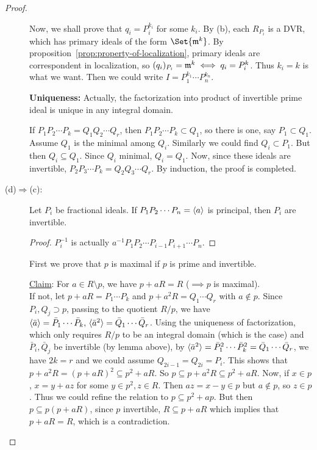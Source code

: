 \begin{theorem}
\begin{proof}
\begin{description}
        Now, we shall prove that $q_i = P_i^{k_i}$ for some $k_i$.
        By (b), each $R_{P_i}$ is a DVR, which has primary ideals
        of the form $\Set{\mf^k}$. By proposition~\ref{prop:property-of-localization},
        primary ideals are correspondent in localization,
        so $(q_i)_{P_i} = \mathfrak{m}^k \iff q_i = P_i^k$. Thus $k_i = k$
        is what we want. Then we could write $I = P_1^{k_1} \dotsm P_n^{k_n}$.

        {\bf Uniqueness:}
        Actually, the factorization into product of invertible
        prime ideal is unique in any integral domain.

        If $P_1 P_2 \dotsm P_k = Q_1 Q_2 \dotsm Q_r$,
        then $P_1 P_2 \dotsm P_k \subset Q_1$, so there is one,
        say $P_1 \subset Q_1$. Assume $Q_1$ is the minimal among $Q_i$.
        Similarly we could find $Q_i \subset P_1$.
        But then $Q_i \subseteq Q_1$. Since $Q_i$ minimal, $Q_i = Q_1$.
        Now, since these ideals are invertible,
        $P_2 P_3 \dotsm P_k = Q_2 Q_3 \dotsm Q_r$. By induction, the proof is completed.
      \item[\rm (d)$\Rightarrow$(c):]
        \begin{lemma}
          Let $P_i$ be fractional ideals. If $P_1 P_2 \dotsm P_n = \langle a\rangle$
          is principal, then $P_i$ are invertible.

          \begin{proof}
            $P_i^{-1}$ is actually $a^{-1} P_1 P_2 \dotsm P_{i-1} P_{i+1} \dotsm P_n$.
          \end{proof}
        \end{lemma}
        First we prove that $p$ is maximal if $p$ is prime and invertible.

        \underline{Claim}: For $a \in R \setminus p$, we have $p+ aR = R$
        ($\implies p$ is maximal). \\
        If not, let $p + aR = P_1 \dotsm P_k$ and $p + a^2 R = Q_1 \dotsm Q_r$
        with $a \notin p$.
        Since $P_i, Q_j \supset p$, passing to the quotient $R/p$, we have
        $\langle\bar{a}\rangle = \bar P_1 \dotsm \bar P_k,\,
        \langle\bar{a}^2\rangle = \bar Q_1 \dotsm \bar Q_r$.
        Using the uniqueness of factorization, which only requires $R/p$
        to be an integral domain (which is the case) and $\bar P_i, \bar Q_j$
        be invertible (by lemma above),
        by $\langle\bar{a}^2\rangle = \bar P_1^2 \dotsm \bar P_k^2 = \bar Q_1 \dotsm \bar Q_r$,
        we have $2k = r$ and we could assume $Q_{2i-1} = Q_{2i} = P_i$.
        This shows that $p + a^2 R = (p + aR)^2 \subseteq p^2 + aR$.
        So $p \subseteq p + a^2 R \subseteq p^2 + aR$. Now, if $x \in p$,
        $x = y + az$ for some $y \in p^2, z \in R$. Then $az = x - y \in p$
        but $a \notin p$, so $z \in p$. Thus we could
        refine the relation to $p \subseteq p^2 + ap$.
        But then $p \subseteq p (p + aR)$, since $p$ invertible, $R \subseteq p + aR$
        which implies that $p + aR = R$, which is a contradiction.


\end{description}
\end{proof}
\end{theorem}
